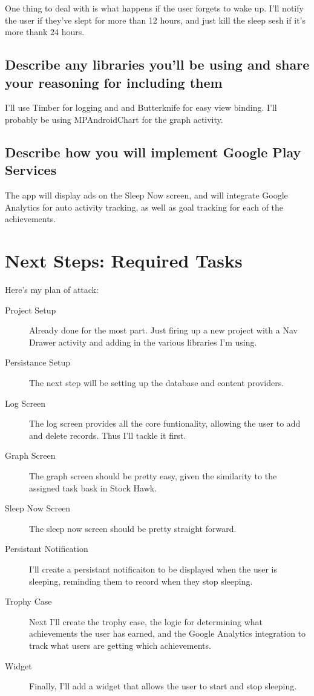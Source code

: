 \documentclass[twoside, letterpaper, american]{article}
\begin{document}
One thing to deal with is what happens if the user forgets to wake up. I'll notify the user if they've slept for more than 12 hours, and just kill the sleep sesh if it's more thank 24 hours.


\subsection*{Describe any libraries you’ll be using and share your reasoning for including them}

I'll use Timber for logging and and Butterknife for easy view binding. I'll probably be using MPAndroidChart for the graph activity.

\subsection*{Describe how you will implement Google Play Services}

The app will display ads on the Sleep Now screen, and will integrate Google Analytics for auto activity tracking, as well as goal tracking for each of the achievements.


\section*{Next Steps: Required Tasks}

Here's my plan of attack:

\begin{description}

\item[Project Setup] Already done for the most part. Just firing up a new project with a Nav Drawer activity and adding in the various libraries I'm using.

\item[Persistance Setup] The next step will be setting up the database and content providers.

\item[Log Screen] The log screen provides all the core funtionality, allowing the user to add and delete records. Thus I'll tackle it first.

\item[Graph Screen] The graph screen should be pretty easy, given the similarity to the assigned task bask in Stock Hawk.

\item[Sleep Now Screen] The sleep now screen should be pretty straight forward.

\item[Persistant Notification] I'll create a persistant notificaiton to be displayed when the user is sleeping, reminding them to record when they stop sleeping.

\item[Trophy Case] Next I'll create the trophy case, the logic for determining what achievements the user has earned, and the Google Analytics integration to track what users are getting which achievements.

\item[Widget] Finally, I'll add a widget that allows the user to start and stop sleeping.

\end{description}
\end{document}
